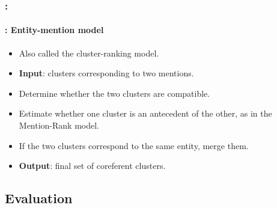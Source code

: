 \documentclass[xcolor=table]{beamer}
\begin{document}
\begin{frame}
	\frametitle{\insertshortsubtitle: \insertsection}
	\framesubtitle{\insertsubsection: Entity-mention model}
	
	\begin{itemize}
		\item Also called the cluster-ranking model.
		\item \textbf{Input}: clusters corresponding to two mentions.
		
		\item Determine whether the two clusters are compatible.
		
		\item Estimate whether one cluster is an antecedent of the other, as in the Mention-Rank model.
		
		\item If the two clusters correspond to the same entity, merge them.
		
		\item \textbf{Output}: final set of coreferent clusters.
		
	\end{itemize}
	
\end{frame}

\subsection{Evaluation}
\end{document}
